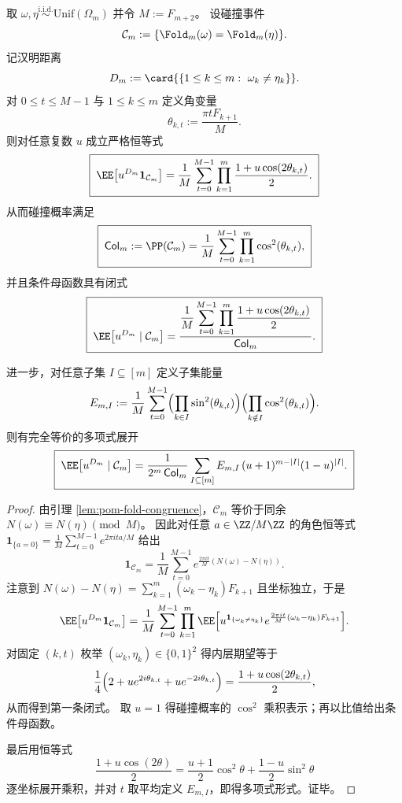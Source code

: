 \begin{proposition}[碰撞条件下汉明距离的闭式母函数与子集能量展开]\label{prop:fold-collision-conditional-hamming-mgf}
取 \(\omega,\eta\overset{\mathrm{i.i.d.}}{\sim}\mathrm{Unif}(\Omega_m)\) 并令 \(M:=F_{m+2}\)。
设碰撞事件
\[
\mathcal C_m:=\{\Fold_m(\omega)=\Fold_m(\eta)\}.
\]
记汉明距离
\[
D_m:=\card{\{1\le k\le m:\ \omega_k\neq \eta_k\}}.
\]
对 \(0\le t\le M-1\) 与 \(1\le k\le m\) 定义角变量
\[
\theta_{k,t}:=\frac{\pi t F_{k+1}}{M}.
\]
则对任意复数 \(u\) 成立严格恒等式
\[
\boxed{\;
\EE\bigl[u^{D_m}\mathbf 1_{\mathcal C_m}\bigr]
=\frac1M\sum_{t=0}^{M-1}\prod_{k=1}^m \frac{1+u\cos(2\theta_{k,t})}{2}.\;}
\]
从而碰撞概率满足
\[
\boxed{\;
\mathsf{Col}_m:=\PP(\mathcal C_m)
=\frac1M\sum_{t=0}^{M-1}\prod_{k=1}^m \cos^2(\theta_{k,t}),\;}
\]
并且条件母函数具有闭式
\[
\boxed{\;
\EE\bigl[u^{D_m}\mid \mathcal C_m\bigr]
=\frac{\displaystyle \frac1M\sum_{t=0}^{M-1}\prod_{k=1}^m \frac{1+u\cos(2\theta_{k,t})}{2}}
{\displaystyle \mathsf{Col}_m}.\;}
\]
\par
进一步，对任意子集 \(I\subseteq[m]\) 定义子集能量
\[
E_{m,I}:=\frac1M\sum_{t=0}^{M-1}\Bigl(\prod_{k\in I}\sin^2(\theta_{k,t})\Bigr)\Bigl(\prod_{k\notin I}\cos^2(\theta_{k,t})\Bigr).
\]
则有完全等价的多项式展开
\[
\boxed{\;
\EE\bigl[u^{D_m}\mid \mathcal C_m\bigr]
=\frac{1}{2^m\,\mathsf{Col}_m}\sum_{I\subseteq[m]} E_{m,I}\,(u+1)^{m-|I|}(1-u)^{|I|}.\;}
\]
\end{proposition}

\begin{proof}
由引理 \ref{lem:pom-fold-congruence}，\(\mathcal C_m\) 等价于同余 \(N(\omega)\equiv N(\eta)\pmod M\)。
因此对任意 \(a\in\ZZ/M\ZZ\) 的角色恒等式
\(
\mathbf 1_{\{a=0\}}=\frac1M\sum_{t=0}^{M-1}e^{2\pi i ta/M}
\)
给出
\[
\mathbf 1_{\mathcal C_m}
=\frac1M\sum_{t=0}^{M-1}
e^{\frac{2\pi i t}{M}(N(\omega)-N(\eta))}.
\]
注意到
\(
N(\omega)-N(\eta)=\sum_{k=1}^m(\omega_k-\eta_k)F_{k+1}
\)
且坐标独立，于是
\[
\EE\bigl[u^{D_m}\mathbf 1_{\mathcal C_m}\bigr]
=\frac1M\sum_{t=0}^{M-1}\prod_{k=1}^m
\EE\Bigl[u^{\mathbf 1_{\{\omega_k\neq\eta_k\}}}e^{\frac{2\pi i t}{M}(\omega_k-\eta_k)F_{k+1}}\Bigr].
\]
对固定 \((k,t)\) 枚举 \((\omega_k,\eta_k)\in\{0,1\}^2\) 得内层期望等于
\[
\frac{1}{4}\Bigl(2+u e^{2i\theta_{k,t}}+u e^{-2i\theta_{k,t}}\Bigr)=\frac{1+u\cos(2\theta_{k,t})}{2},
\]
从而得到第一条闭式。
取 \(u=1\) 得碰撞概率的 \(\cos^2\) 乘积表示；再以比值给出条件母函数。
\par
最后用恒等式
\[
\frac{1+u\cos(2\theta)}{2}
=\frac{u+1}{2}\cos^2\theta+\frac{1-u}{2}\sin^2\theta
\]
逐坐标展开乘积，并对 \(t\) 取平均定义 \(E_{m,I}\)，即得多项式形式。证毕。
\end{proof}

